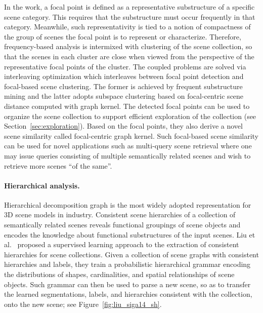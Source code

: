 In the work, a focal point is defined as a representative substructure of a specific scene category.
This requires that the substructure must occur frequently in that category.
Meanwhile, such representativity is tied to a notion of compactness of the group of scenes the focal
point is to represent or characterize. Therefore, frequency-based analysis is intermixed with clustering of the
scene collection, so that the scenes in each cluster are close when viewed from the perspective of the
representative focal points of the cluster.
%
The coupled problems are solved via interleaving optimization which interleaves between focal point detection
and focal-based scene clustering. The former is achieved by frequent substructure mining and the
latter adopts subspace clustering based on focal-centric scene distance computed with graph kernel.
%
The detected focal points can be used to organize the scene collection to support efficient exploration
of the collection (see Section~\ref{sec:exploration}).
Based on the focal points, they also derive a novel scene similarity called focal-centric graph kernel.
Such focal-based scene similarity can be used for novel applications such as multi-query scene retrieval
where one may issue queries consisting of multiple semantically related scenes and wish to retrieve more
scenes ``of the same''.%

%

\paragraph*{Hierarchical analysis.}
Hierarchical decomposition graph is the most widely adopted representation for 3D scene models in industry.
Consistent scene hierarchies of a collection of semantically related scenes
reveals functional groupings of scene objects and encodes the knowledge about functional substructures of the input scenes.
Liu et al.~ proposed a supervised learning approach to the extraction of consistent
hierarchies for scene collections.
Given a collection of scene graphs with consistent hierarchies and labels, they train
a probabilistic hierarchical grammar encoding the distributions of shapes, cardinalities,
and spatial relationships of scene objects.
Such grammar can then be used to parse a new scene, so as to transfer the learned segmentations, labels, and hierarchies
consistent with the collection, onto the new scene; see Figure~\ref{fig:liu_siga14_sh}.

